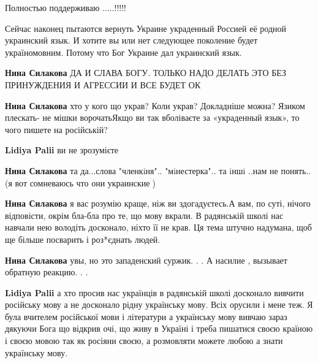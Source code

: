 \begin{itemize}
Полностью поддерживаю .....!!!!!


Сейчас наконец пытаются вернуть Украине украденный Россией её родной украинский
язык. И хотите вы или нет следующее поколение будет україномовним. Потому что
Бог Украине дал украинский язык.

\begin{itemize}
\textbf{Нина Силакова} ДА И СЛАВА БОГУ. ТОЛЬКО НАДО ДЕЛАТЬ ЭТО БЕЗ ПРИНУЖДЕНИЯ И АГРЕССИИ И ВСЕ БУДЕТ ОК

\textbf{Нина Силакова} хто у кого що украв? Коли украв? Докладніше можна?
Язиком плескать- не мішки ворочатьЯкщо ви так вболіваєте за «украденный язык»,
то чого пишете на російській?

\textbf{Lidiya Palii} ви не зрозумієте

\textbf{Нина Силакова}
та да...слова
"членкiня"..
"мiнестерка"..
та iншi ..нам не понять..
(я вот сомневаюсь что они украинские🤔)

\textbf{Нина Силакова} я вас розумію краще, ніж ви здогадуєтесь.А вам, по суті,
нічого відповісти, окрім бла-бла про те, що мову вкрали. В радянській школі нас
навчали нею володіть досконало, ніхто її не крав. Ця тема штучно надумана, щоб
ще більше посварить і роз*єднать людей.

\textbf{Нина Силакова} увы, но это западенский суржик. . . А насилие , вызывает обратную реакцию. . .

\textbf{Lidiya Palii} а хто просив нас українців в радянській школі досконало
вивчити російську мову а не досконало рідну українську мову. Всіх орусили і
мене теж. Я була вчителем російської мови і літератури а українську мову вивчаю
зараз дякуючи Бога що відкрив очі, що живу в Україні і треба пишатися своєю
країною і своєю мовою так як росіяни своєю, а розмовляти можете любою а знати
українську мову.

\end{itemize}



\end{itemize}

